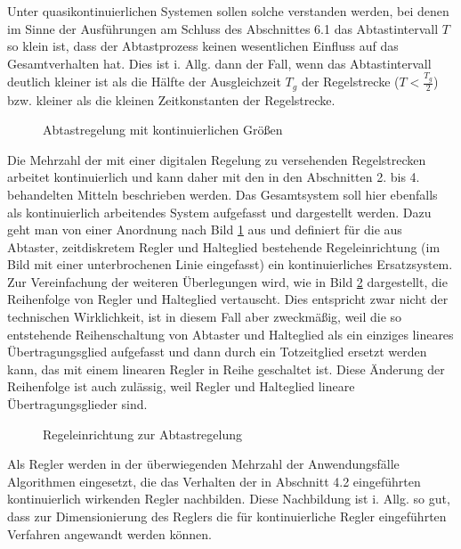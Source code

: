 Unter quasikontinuierlichen Systemen sollen solche verstanden werden, bei denen im Sinne der Ausführungen am Schluss des Abschnittes 6.1 das Abtastintervall \(T\) so klein ist, dass der Abtastprozess keinen wesentlichen Einfluss auf das Gesamtverhalten hat.
Dies ist i. Allg. dann der Fall, wenn das Abtastintervall deutlich kleiner ist als die Hälfte der Ausgleichzeit \(T_g\) der Regelstrecke (\(T < \frac{T_g}{2}\)) bzw. kleiner als die kleinen Zeitkonstanten der Regelstrecke.
\begin{figure}[ht]
	\centering
	\caption{Abtastregelung mit kontinuierlichen Größen}
	\label{fig:6-10}
\end{figure}
Die Mehrzahl der mit einer digitalen Regelung zu versehenden Regelstrecken arbeitet kontinuierlich und kann daher mit den in den Abschnitten 2. bis 4. behandelten Mitteln beschrieben werden.
Das Gesamtsystem soll hier ebenfalls als kontinuierlich arbeitendes System aufgefasst und dargestellt werden.
Dazu geht man von einer Anordnung nach Bild \ref{fig:6-10} aus und definiert für die aus Abtaster, zeitdiskretem Regler und Halteglied bestehende Regeleinrichtung (im Bild mit einer unterbrochenen Linie eingefasst) ein kontinuierliches Ersatzsystem.
Zur Vereinfachung der weiteren Überlegungen wird, wie in Bild \ref{fig:6-11} dargestellt, die Reihenfolge von Regler und Halteglied vertauscht.
Dies entspricht zwar nicht der technischen Wirklichkeit, ist in diesem Fall aber zweckmäßig, weil die so entstehende Reihenschaltung von Abtaster und Halteglied als ein einziges lineares Übertragungsglied aufgefasst und dann durch ein Totzeitglied ersetzt werden kann, das mit einem linearen Regler in Reihe geschaltet ist.
Diese Änderung der Reihenfolge ist auch zulässig, weil Regler und Halteglied lineare Übertragungsglieder sind.
\begin{figure}[ht]
	\centering
	\caption{Regeleinrichtung zur Abtastregelung}
	\label{fig:6-11}
\end{figure}
Als Regler werden in der überwiegenden Mehrzahl der Anwendungsfälle Algorithmen eingesetzt, die das Verhalten der in Abschnitt 4.2 eingeführten kontinuierlich wirkenden Regler nachbilden.
Diese Nachbildung ist i. Allg. so gut, dass zur Dimensionierung des Reglers die für kontinuierliche Regler eingeführten Verfahren angewandt werden können.
